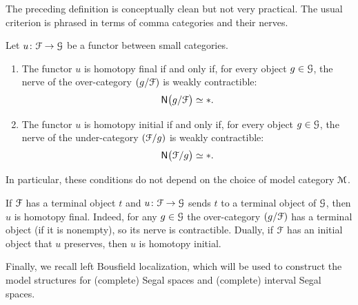 The preceding definition is conceptually clean but not very practical.  The
usual criterion is phrased in terms of comma categories and their nerves.

\begin{proposition}\label{ch2::prop:homotopy-final-initial}
  Let $u \colon \mathcal F \to \mathcal G$ be a functor between small categories.
  \begin{enumerate}
    \item The functor $u$ is homotopy final if and only if, for every object
      $g \in \mathcal G$, the nerve of the over-category $(g / \mathcal F)$ is
      weakly contractible:
      \begin{equation}
        \mathsf N\bigl(g / \mathcal F\bigr) \simeq *.
      \end{equation}
    \item The functor $u$ is homotopy initial if and only if, for every object
      $g \in \mathcal G$, the nerve of the under-category $(\mathcal F / g)$ is
      weakly contractible:
      \begin{equation}
        \mathsf N\bigl(\mathcal F / g\bigr) \simeq *.
      \end{equation}
  \end{enumerate}
  In particular, these conditions do not depend on the choice of model
  category $\mathcal M$.
\end{proposition}

\begin{example}
  If $\mathcal F$ has a terminal object $t$ and $u \colon \mathcal F \to \mathcal G$ sends $t$ to a
  terminal object of $\mathcal G$, then $u$ is homotopy final.  Indeed, for any
  $g \in \mathcal G$ the over-category $(g / \mathcal F)$ has a terminal object (if
  it is nonempty), so its nerve is contractible.  Dually, if $\mathcal F$ has an
  initial object that $u$ preserves, then $u$ is homotopy initial.
\end{example}



Finally, we recall left Bousfield localization, which will be used to
construct the model structures for (complete) Segal spaces and (complete) interval Segal spaces.

